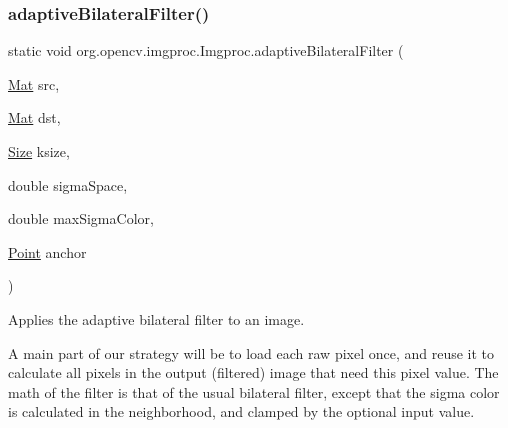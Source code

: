 \subsubsection{\texorpdfstring{adaptive\+Bilateral\+Filter()}{adaptiveBilateralFilter()}\hspace{0.1cm}{\footnotesize\ttfamily [2/3]}}
{\footnotesize\ttfamily static void org.\+opencv.\+imgproc.\+Imgproc.\+adaptive\+Bilateral\+Filter (\begin{DoxyParamCaption}\item[{\mbox{\hyperlink{classorg_1_1opencv_1_1core_1_1_mat}{Mat}}}]{src,  }\item[{\mbox{\hyperlink{classorg_1_1opencv_1_1core_1_1_mat}{Mat}}}]{dst,  }\item[{\mbox{\hyperlink{classorg_1_1opencv_1_1core_1_1_size}{Size}}}]{ksize,  }\item[{double}]{sigma\+Space,  }\item[{double}]{max\+Sigma\+Color,  }\item[{\mbox{\hyperlink{classorg_1_1opencv_1_1core_1_1_point}{Point}}}]{anchor }\end{DoxyParamCaption})\hspace{0.3cm}{\ttfamily [static]}}

Applies the adaptive bilateral filter to an image.

A main part of our strategy will be to load each raw pixel once, and reuse it to calculate all pixels in the output (filtered) image that need this pixel value. The math of the filter is that of the usual bilateral filter, except that the sigma color is calculated in the neighborhood, and clamped by the optional input value.


